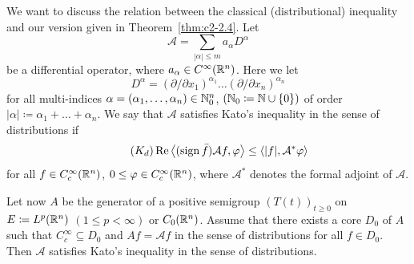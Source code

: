 We want to discuss the relation between the classical (distributional) inequality and our version given in Theorem~\ref{thm:c2-2.4}.
Let 
\[
\mathcal{A} =  \sum_{|\alpha| \leq m} a_{\alpha} D^{\alpha}
\]
be a differential operator, where $a_{\alpha} \in C^{\infty}(\mathbb{R}^n)$.
Here we let 
\[
D^{\alpha} = (\partial/\partial x_1)^{\alpha_1} \ldots (\partial/\partial x_{n})^{\alpha_{n}}
\]
for all multi-indices $\alpha = (\alpha_1,\ldots,\alpha_{n}) \in \mathbb{N}_{0}^n$, 
$(\mathbb{N}_{0} \coloneq \mathbb{N}\cup\{0\})$ of order $|\alpha| \coloneq \alpha_1 + \ldots + \alpha_{n}$.
We say that $\mathcal{A}$ satisfies Kato's inequality in the sense of distributions if
\begin{equation}\label{eq:c2-Kd} \tag{$K_{d}$}
\Re\left\langle(\sign \bar{f})\mathcal{A}f, \phi \right\rangle \leq \langle|f|, \mathcal{A}^{*}\phi \rangle
\end{equation}
for all $f \in C_{c}^{\infty}(\mathbb{R}^n)$, $0 \leq \phi \in C_{c}^{\infty}(\R^n)$, where $\mathcal{A}^{*}$ denotes the formal adjoint of\/ $\mathcal{A}$. 

Let now $A$ be the generator of a positive semigroup $(T(t))_{t \geq 0}$ on $E \coloneq L^p(\mathbb{R}^n)$ $(1 \leq p < \infty)$ or $C_{0}(\mathbb{R}^n)$.
Assume that there exists a core
$D_{0}$ of\/ $A$ such that $C_{c}^{\infty} \subseteq D_{0}$ and $Af = \mathcal{A}f$ in the sense of distributions for all $f \in D_{0}$.
Then $\mathcal{A}$ satisfies Kato's inequality in the sense of distributions.

